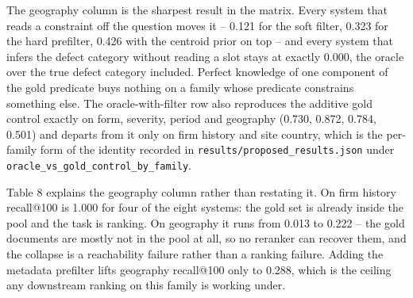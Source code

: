 \documentclass[acmsmall]{acmart}
\begin{document}
The geography column is the sharpest result in the matrix. Every system that reads a constraint off the question moves it -- 0.121 for the soft filter, 0.323 for the hard prefilter, 0.426 with the centroid prior on top -- and every system that infers the defect category without reading a slot stays at exactly 0.000, the oracle over the true defect category included. Perfect knowledge of one component of the gold predicate buys nothing on a family whose predicate constrains something else. The oracle-with-filter row also reproduces the additive gold control exactly on form, severity, period and geography (0.730, 0.872, 0.784, 0.501) and departs from it only on firm history and site country, which is the per-family form of the identity recorded in \texttt{results/proposed\_\allowbreak{}results.json} under \texttt{oracle\_vs\_\allowbreak{}gold\_\allowbreak{}control\_\allowbreak{}by\_family}.


\begin{table}[t]
\centering
\small
\caption{Table 8: recall@100 by question family, text-only systems, test split. This is what the candidate pool makes reachable before any ranking decision.}
\end{table}

Table 8 explains the geography column rather than restating it. On firm history recall@100 is 1.000 for four of the eight systems: the gold set is already inside the pool and the task is ranking. On geography it runs from 0.013 to 0.222 -- the gold documents are mostly not in the pool at all, so no reranker can recover them, and the collapse is a reachability failure rather than a ranking failure. Adding the metadata prefilter lifts geography recall@100 only to 0.288, which is the ceiling any downstream ranking on this family is working under.
\end{document}
